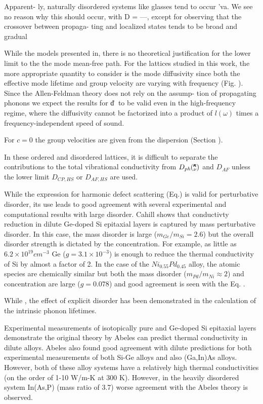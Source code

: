 \documentclass[aps,prb,twocolumn,superscriptaddress,amsmath,amssymb,floatfix]{revtex4}
\newcommand{\kv}{\mspace{-4.0mu}\left(\mspace{-8.0mu}
\begin{smallmatrix}&\pmb{\kappa} \\&\nu\end{smallmatrix}
\mspace{-3.0mu}\right)}
\begin{document}
Apparent-
ly, naturally disordered systems like glasses tend to occur
'va. We see no reason why this should occur,
with D = —,
except for observing that the crossover between propaga-
ting and localized states tends to be broad and gradual



While the models presented in, there is no theoretical justification for 
the lower limit to the the mode mean-free path.\cite{graebner_phonon_1986} 
For the lattices studied in this work, the more appropriate quantity to 
consider is the mode diffusivity since both the 
effective mode lifetime   
and group velocity are varying with frequency (Fig. ). 
Since the Allen-Feldman theory does not rely on the assump-
tion of propagating phonons we expect the results for d͑␻͒
to be valid even in the high-frequency regime, where the
diffusivity cannot be factorized into a product of $l(\omega)$ times
a frequency-independent speed of sound.


For $c=0$ the group velocities are given from the dispersion (Section ). 

In these ordered and disordered lattices, it is difficult to separate 
the contributions to the total vibrational 
conductivity from $D_{ph}\kv$ and $D_{AF}$ unless the lower limit 
$D_{CP,HS}$ or $D_{AF,HS}$ are used.  

While the
expression for harmonic defect scattering (Eq.) is valid for
perturbative disorder, its use leads to good agreement with
several experimental and computational results with large disorder.  
Cahill shows that conductivty reduction in dilute 
Ge-doped Si epitaxial layers 
is captured by mass perturbative disorder.\cite{cahill_thermal_2005} 
In this case, the mass disorder is large ($m_{Ge}/m_{Si} = 2.6$) 
but the overall disorder strength is dictated by the concentration. 
For example, as little as $6.2\times10^{19} cm^{-3}$ Ge
($g = 3.1\times10^{-3}$) is enough to reduce the thermal conductivity of 
Si by almost a factor of 2.\cite{cahill_thermal_2004}
In the
case of the $Ni_{0.55}Pd_{0.45}$ alloy, the atomic species
are chemically similar but both the mass disorder 
($m_{Pd}/m_{Ni} \approx 2$) and concentration are large ($g=0.078$) 
and good agreement is seen with the Eq. .
\cite{kamitakahara_vibrations_1974}

While , the effect of explicit disorder has been demonstrated in the 
calculation of the intrinsic phonon lifetimes.\cite{garg_role_2011}

Experimental measurements of isotopically pure and Ge-doped 
Si epitaxial layers demonstrate the original theory by Abeles can predict 
thermal conductivity in dilute alloys. Abeles also found good agreement 
with dilute predictions for both experimental measurements of both 
Si-Ge alloys and also (Ga,In)As alloys.\cite{abeles_lattice_1963} However, 
both of these alloy systems have a relatively high thermal conductivities 
(on the order of 1-10 W/m-K at 300 K). However, in the heavily disordered 
system In(As,P) (mass ratio of 3.7) worse agreement with the Abeles theory 
is observed. 
\end{document}
